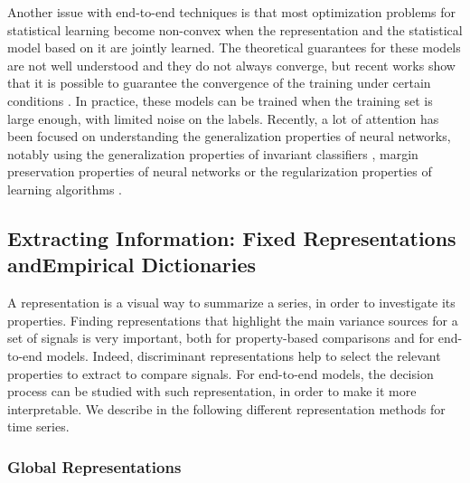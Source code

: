 \documentclass[../thesis.tex]{subfiles}
\begin{document}
Another issue with end-to-end techniques is that most optimization problems for statistical learning become non-convex when the representation and the statistical model based on it are jointly learned. The theoretical guarantees for these models are not well understood and they do not always converge, but recent works show that it is possible to guarantee the convergence of the training under certain conditions \citep{Agarwal2013, Haeffele2015, Haeffele2017}. In practice, these models can be trained when the training set is large enough, with limited noise on the labels. Recently, a lot of attention has been focused on understanding the generalization properties of neural networks, notably using the generalization properties of invariant classifiers \citep{Sokolic2017}, margin preservation properties of neural networks \citep{Sokolic2016} or the regularization properties of learning algorithms \citep{Neyshabur2015, Keskar2017, Neyshabur2017a}.







\subsection[Extracting Information: Fixed Representations and\\Empirical Dictionaries]{%
			Extracting Information: Fixed Representations and\linebreak[1]Empirical Dictionaries}
\label{sub:intro:ts_rpz}

A representation is a visual way to summarize a series, in order to investigate its properties. Finding representations that highlight the main variance sources for a set of signals is very important, both for property-based comparisons and for end-to-end models. Indeed, discriminant representations help to select the relevant properties to extract to compare signals. For end-to-end models, the decision process can be studied with such representation, in order to make it more interpretable. We describe in the following different representation methods for time  series.



\subsubsection{Global Representations}
\label{ssub:intro:rpz:global}
\end{document}
